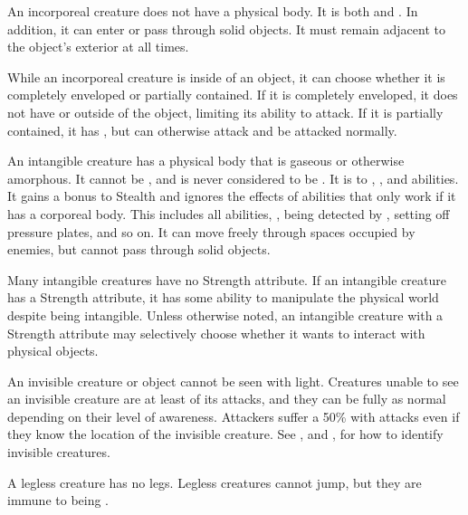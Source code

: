   An incorporeal creature does not have a physical body.
  It is both  and .
  In addition, it can enter or pass through solid objects.
  It must remain adjacent to the object's exterior at all times.

  While an incorporeal creature is inside of an object, it can choose whether it is completely enveloped or partially contained.
  If it is completely enveloped, it does not have  or  outside of the object, limiting its ability to attack.
  If it is partially contained, it has , but can otherwise attack and be attacked normally.

  An intangible creature has a physical body that is gaseous or otherwise amorphous.
  It cannot be , and is never considered to be \squeezing.
  It is  to , \atCreation, and \atManifestation abilities.
  It gains a  bonus to Stealth and ignores the effects of abilities that only work if it has a corporeal body.
  This includes all  abilities, , being detected by , setting off pressure plates, and so on.
  It can move freely through spaces occupied by enemies, but cannot pass through solid objects.

  Many intangible creatures have no Strength attribute.
  If an intangible creature has a Strength attribute, it has some ability to manipulate the physical world despite being intangible.
  Unless otherwise noted, an intangible creature with a Strength attribute may selectively choose whether it wants to interact with physical objects.

  An invisible creature or object cannot be seen with light.
  Creatures unable to see an invisible creature are at least \partiallyunaware of its attacks, and they can be fully \unaware as normal depending on their level of awareness.
  Attackers suffer a 50\%  with  attacks even if they know the location of the invisible creature.
  See , and , for how to identify invisible creatures.

  A legless creature has no legs.
  Legless creatures cannot jump, but they are immune to being \prone.

